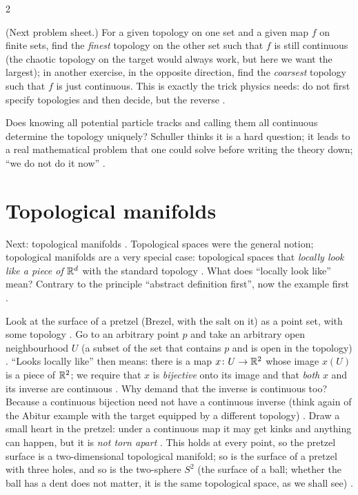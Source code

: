 \begin{paracol}{2}
\begin{exercise}\label{ex:tm-final-initial}
(Next problem sheet.) For a given topology on one set and a given map $f$ on finite sets, find the \emph{finest}
topology on the other set such that $f$ is still continuous (the chaotic topology on the target would always work, but
here we want the largest); in another exercise, in the opposite direction, find the \emph{coarsest}
topology such that $f$ is just continuous. This is exactly the trick physics needs: do not first specify topologies and
then decide, but the reverse .
\end{exercise}
Does knowing all potential particle tracks and calling them all continuous determine the topology uniquely? Schuller
thinks it is a hard question; it leads to a real mathematical problem that one could solve before writing the theory down;
``we do not do it now'' .

\section{Topological manifolds}\label{sec:tm-manifolds}

Next: topological manifolds . Topological spaces were the general notion; topological
manifolds are a very special case: topological spaces that \emph{locally look like a piece of $\mathbb{R}^d$} with the standard
topology . What does ``locally look like'' mean? Contrary to the
principle ``abstract definition first'', now the example first .

\begin{example}\label{ex:tm-pretzel}
Look at the surface of a pretzel (Brezel, with the salt on it) as a point set, with some topology .
Go to an arbitrary point $p$ and take an arbitrary open neighbourhood $U$ (a subset of the set that contains $p$ and is
open in the topology) . ``Looks locally like'' then
means: there is a map $x\colon U\to\mathbb{R}^2$ whose image $x(U)$ is a piece of $\mathbb{R}^2$; we require that $x$ is \emph{bijective}
onto its image and that \emph{both} $x$ and its inverse are continuous
.
Why demand that the inverse is continuous too? Because a continuous bijection need not have a continuous inverse
(think again of the Abitur example with the target equipped by a different topology) .
Draw a small heart in the pretzel: under a continuous map it may get kinks and anything can happen, but it is \emph{not torn
apart} . This holds at every point, so the pretzel surface is a two-dimensional
topological manifold; so is the surface of a pretzel with three holes, and so is the two-sphere $S^2$ (the surface of
a ball; whether the ball has a dent does not matter, it is the same topological space, as we shall see) .
\end{example}


\end{paracol}

